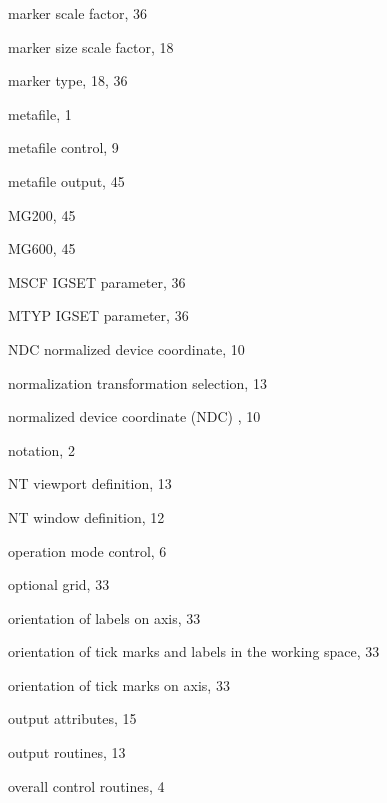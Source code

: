 \begin{theindex}
  \indexspace
 
  \item marker scale factor, 36
  \item marker size scale factor, 18
  \item marker type, 18, 36
  \item metafile, 1
  \item metafile control, 9
  \item metafile output, 45
  \item MG200, 45
  \item MG600, 45
  \item MSCF
    \subitem IGSET parameter, 36
  \item MTYP
    \subitem IGSET parameter, 36
 
  \indexspace
 
  \item NDC
    \subitem normalized device coordinate, 10
  \item normalization transformation selection, 13
  \item normalized device coordinate (NDC) , 10
  \item notation, 2
  \item NT viewport definition, 13
  \item NT window definition, 12
 
  \indexspace
 
  \item operation mode control, 6
  \item optional grid, 33
  \item orientation of labels on axis, 33
  \item orientation of tick marks and labels in the working space, 33
  \item orientation of tick marks on axis, 33
  \item output attributes, 15
  \item output routines, 13
  \item overall control routines, 4
 
  \indexspace
 

\end{theindex}
